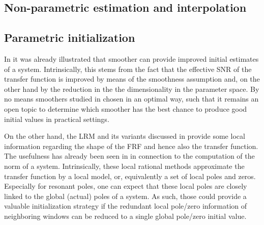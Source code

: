   \subsection{Non-parametric estimation and interpolation}

  \subsection{Parametric initialization}
  In  it was already illustrated that smoother can provide improved initial estimates of a system. 
  Intrinsically, this stems from the fact that the effective \gls{SNR} of the transfer function is improved by means of the smoothness assumption and, on the other hand by the reduction in the the dimensionality in the parameter space.
  By no means smoothers studied in  chosen in an optimal way, such that it remains an open topic to determine which smoother has the best chance to produce good initial values in practical settings.

  On the other hand, the \gls{LRM} and its variants discussed in  provide some local information regarding the shape of the \gls{FRF} and hence also the transfer function.
  The usefulness has already been seen in  in connection to the computation of the \Hinf norm of a system.
  Intrinsically, these local rational methods approximate the transfer function by a local model, or, equivalently a set of local poles and zeros.
  Especially for resonant poles, one can expect that these local poles are closely linked to the global (actual) poles of a system.
  As such, those could provide a valuable initialization strategy if the redundant local pole/zero information of neighboring windows can be reduced to a single global pole/zero initial value.
